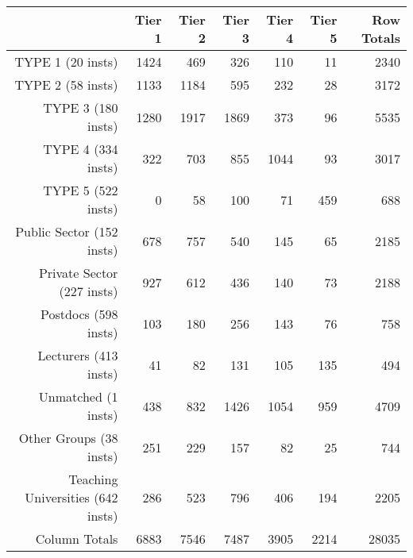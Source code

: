 \begin{tabular}{rrrrrrr}
  \hline
   & \textbf{Tier 1} & \textbf{Tier 2} & \textbf{Tier 3} & \textbf{Tier 4} & \textbf{Tier 5} & \textbf{Row Totals} \\\hline
  TYPE 1 (20 insts) & 1424 & 469 & 326 & 110 & 11 & 2340 \\
  TYPE 2 (58 insts) & 1133 & 1184 & 595 & 232 & 28 & 3172 \\
  TYPE 3 (180 insts) & 1280 & 1917 & 1869 & 373 & 96 & 5535 \\
  TYPE 4 (334 insts) & 322 & 703 & 855 & 1044 & 93 & 3017 \\
  TYPE 5 (522 insts) & 0 & 58 & 100 & 71 & 459 & 688 \\
  Public Sector (152 insts) & 678 & 757 & 540 & 145 & 65 & 2185 \\
  Private Sector (227 insts) & 927 & 612 & 436 & 140 & 73 & 2188 \\
  Postdocs (598 insts) & 103 & 180 & 256 & 143 & 76 & 758 \\
  Lecturers (413 insts) & 41 & 82 & 131 & 105 & 135 & 494 \\
  Unmatched (1 insts) & 438 & 832 & 1426 & 1054 & 959 & 4709 \\
  Other Groups (38 insts) & 251 & 229 & 157 & 82 & 25 & 744 \\
  Teaching Universities (642 insts) & 286 & 523 & 796 & 406 & 194 & 2205 \\
  Column Totals & 6883 & 7546 & 7487 & 3905 & 2214 & 28035 \\\hline
\end{tabular}
